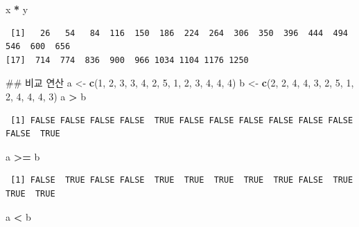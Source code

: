 \documentclass[11pt,a4paper]{book}
\newenvironment{Shaded}{\begin{snugshade}}{\end{snugshade}}
\newcommand{\KeywordTok}[1]{\textcolor[rgb]{0.13,0.29,0.53}{\textbf{#1}}}
\newcommand{\DecValTok}[1]{\textcolor[rgb]{0.00,0.00,0.81}{#1}}
\newcommand{\StringTok}[1]{\textcolor[rgb]{0.31,0.60,0.02}{#1}}
\newcommand{\OperatorTok}[1]{\textcolor[rgb]{0.81,0.36,0.00}{\textbf{#1}}}
\newcommand{\NormalTok}[1]{#1}
\theoremstyle{definition}
\theoremstyle{definition}
\theoremstyle{definition}
\theoremstyle{remark}
\begin{document}
\begin{Shaded}
\begin{Highlighting}[]
\NormalTok{x }\OperatorTok{*}\StringTok{ }\NormalTok{y}
\end{Highlighting}
\end{Shaded}

\begin{verbatim}
 [1]   26   54   84  116  150  186  224  264  306  350  396  444  494  546  600  656
[17]  714  774  836  900  966 1034 1104 1176 1250
\end{verbatim}

\begin{Shaded}
\begin{Highlighting}[]
\NormalTok{## 비교 연산}
\NormalTok{a <-}\StringTok{ }\KeywordTok{c}\NormalTok{(}\DecValTok{1}\NormalTok{, }\DecValTok{2}\NormalTok{, }\DecValTok{3}\NormalTok{, }\DecValTok{3}\NormalTok{, }\DecValTok{4}\NormalTok{, }\DecValTok{2}\NormalTok{, }\DecValTok{5}\NormalTok{, }\DecValTok{1}\NormalTok{, }\DecValTok{2}\NormalTok{, }\DecValTok{3}\NormalTok{, }\DecValTok{4}\NormalTok{, }\DecValTok{4}\NormalTok{, }\DecValTok{4}\NormalTok{)}
\NormalTok{b <-}\StringTok{ }\KeywordTok{c}\NormalTok{(}\DecValTok{2}\NormalTok{, }\DecValTok{2}\NormalTok{, }\DecValTok{4}\NormalTok{, }\DecValTok{4}\NormalTok{, }\DecValTok{3}\NormalTok{, }\DecValTok{2}\NormalTok{, }\DecValTok{5}\NormalTok{, }\DecValTok{1}\NormalTok{, }\DecValTok{2}\NormalTok{, }\DecValTok{4}\NormalTok{, }\DecValTok{4}\NormalTok{, }\DecValTok{4}\NormalTok{, }\DecValTok{3}\NormalTok{)}
\NormalTok{a }\OperatorTok{>}\StringTok{ }\NormalTok{b}
\end{Highlighting}
\end{Shaded}

\begin{verbatim}
 [1] FALSE FALSE FALSE FALSE  TRUE FALSE FALSE FALSE FALSE FALSE FALSE FALSE  TRUE
\end{verbatim}

\begin{Shaded}
\begin{Highlighting}[]
\NormalTok{a }\OperatorTok{>=}\StringTok{ }\NormalTok{b}
\end{Highlighting}
\end{Shaded}

\begin{verbatim}
 [1] FALSE  TRUE FALSE FALSE  TRUE  TRUE  TRUE  TRUE  TRUE FALSE  TRUE  TRUE  TRUE
\end{verbatim}

\begin{Shaded}
\begin{Highlighting}[]
\NormalTok{a }\OperatorTok{<}\StringTok{ }\NormalTok{b}
\end{Highlighting}
\end{Shaded}
\end{document}
